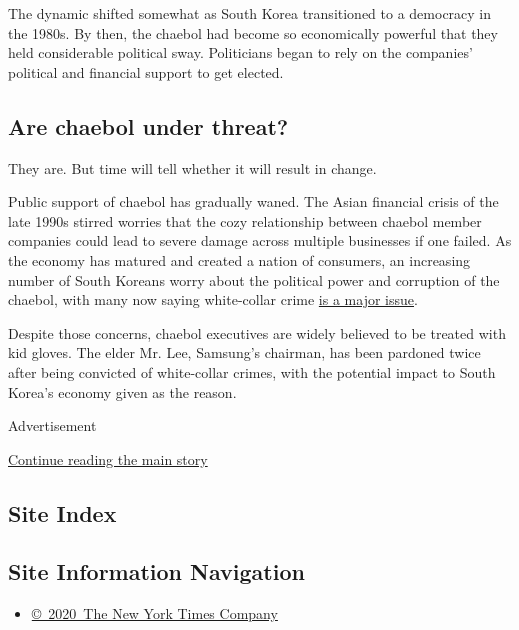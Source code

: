 The dynamic shifted somewhat as South Korea transitioned to a democracy
in the 1980s. By then, the chaebol had become so economically powerful
that they held considerable political sway. Politicians began to rely on
the companies' political and financial support to get elected.

\hypertarget{are-chaebol-under-threat}{%
\subsection{Are chaebol under threat?}\label{are-chaebol-under-threat}}

They are. But time will tell whether it will result in change.

Public support of chaebol has gradually waned. The Asian financial
crisis of the late 1990s stirred worries that the cozy relationship
between chaebol member companies could lead to severe damage across
multiple businesses if one failed. As the economy has matured and
created a nation of consumers, an increasing number of South Koreans
worry about the political power and corruption of the chaebol, with many
now saying white-collar crime
\href{https://www.nytimes3xbfgragh.onion/2016/07/05/business/dealbook/south-korea-targets-executives-pressed-by-an-angry-public.html}{is
a major issue}.

Despite those concerns, chaebol executives are widely believed to be
treated with kid gloves. The elder Mr. Lee, Samsung's chairman, has been
pardoned twice after being convicted of white-collar crimes, with the
potential impact to South Korea's economy given as the reason.

Advertisement

\protect\hyperlink{after-bottom}{Continue reading the main story}

\hypertarget{site-index}{%
\subsection{Site Index}\label{site-index}}

\hypertarget{site-information-navigation}{%
\subsection{Site Information
Navigation}\label{site-information-navigation}}

\begin{itemize}
\tightlist
\item
  \href{https://help.nytimes3xbfgragh.onion/hc/en-us/articles/115014792127-Copyright-notice}{©~2020~The
  New York Times Company}
\end{itemize}

